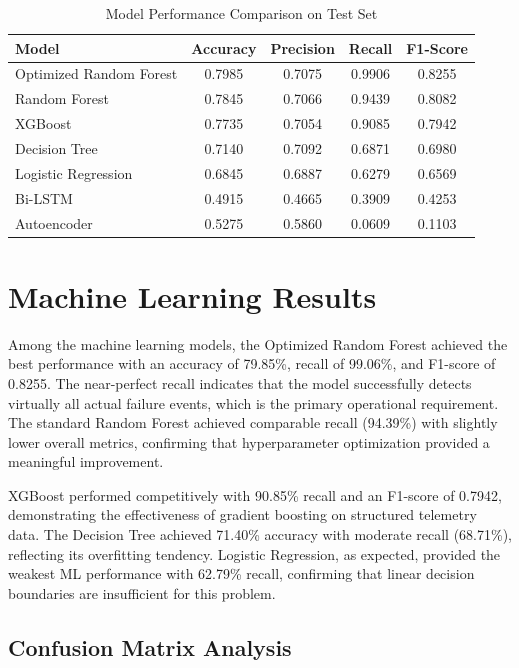 \documentclass[12pt,letterpaper]{report}
\begin{document}
\begin{table}[H]
\centering
\caption{Model Performance Comparison on Test Set}
\label{tab:model_comparison}
\begin{tabular}{lcccc}
\toprule
\textbf{Model} & \textbf{Accuracy} & \textbf{Precision} & \textbf{Recall} & \textbf{F1-Score} \\
\midrule
Optimized Random Forest & 0.7985 & 0.7075 & 0.9906 & 0.8255 \\
Random Forest & 0.7845 & 0.7066 & 0.9439 & 0.8082 \\
XGBoost & 0.7735 & 0.7054 & 0.9085 & 0.7942 \\
Decision Tree & 0.7140 & 0.7092 & 0.6871 & 0.6980 \\
Logistic Regression & 0.6845 & 0.6887 & 0.6279 & 0.6569 \\
\midrule
Bi-LSTM & 0.4915 & 0.4665 & 0.3909 & 0.4253 \\
Autoencoder & 0.5275 & 0.5860 & 0.0609 & 0.1103 \\
\bottomrule
\end{tabular}
\end{table}

\section{Machine Learning Results}

Among the machine learning models, the Optimized Random Forest achieved the best performance with an accuracy of 79.85\%, recall of 99.06\%, and F1-score of 0.8255. The near-perfect recall indicates that the model successfully detects virtually all actual failure events, which is the primary operational requirement. The standard Random Forest achieved comparable recall (94.39\%) with slightly lower overall metrics, confirming that hyperparameter optimization provided a meaningful improvement.

XGBoost performed competitively with 90.85\% recall and an F1-score of 0.7942, demonstrating the effectiveness of gradient boosting on structured telemetry data. The Decision Tree achieved 71.40\% accuracy with moderate recall (68.71\%), reflecting its overfitting tendency. Logistic Regression, as expected, provided the weakest ML performance with 62.79\% recall, confirming that linear decision boundaries are insufficient for this problem.

\subsection{Confusion Matrix Analysis}
\end{document}
